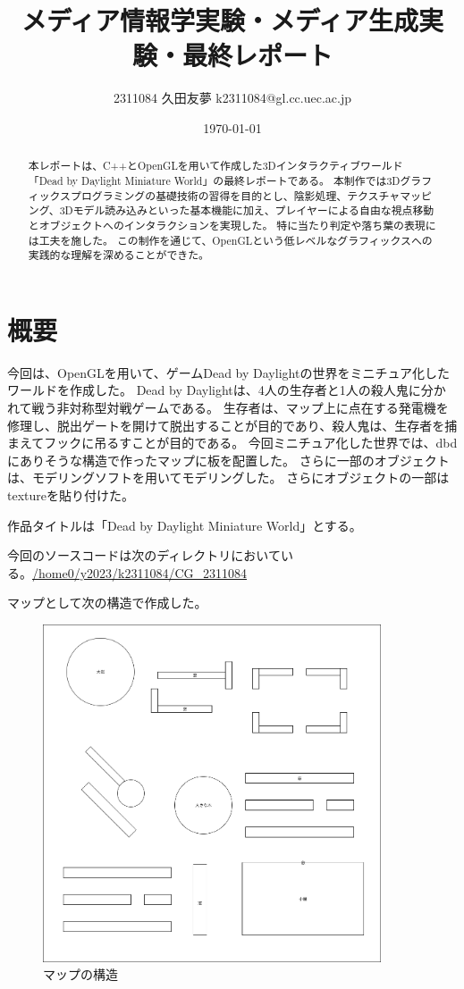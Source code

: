 \documentclass[uplatex,dvipdfmx,a4paper]{jsarticle}
\title{メディア情報学実験・メディア生成実験・最終レポート}
\author{2311084 久田友夢 k2311084@gl.cc.uec.ac.jp}
\date{\today}
\begin{document}
\maketitle

\begin{abstract}
本レポートは、C++とOpenGLを用いて作成した3Dインタラクティブワールド「Dead by Daylight Miniature World」の最終レポートである。
本制作では3Dグラフィックスプログラミングの基礎技術の習得を目的とし、陰影処理、テクスチャマッピング、3Dモデル読み込みといった基本機能に加え、プレイヤーによる自由な視点移動とオブジェクトへのインタラクションを実現した。
特に当たり判定や落ち葉の表現には工夫を施した。
この制作を通じて、OpenGLという低レベルなグラフィックスへの実践的な理解を深めることができた。
\end{abstract}

\tableofcontents
\clearpage

\section{概要}
今回は、OpenGLを用いて、ゲームDead by Daylightの世界をミニチュア化したワールドを作成した。
Dead by Daylightは、4人の生存者と1人の殺人鬼に分かれて戦う非対称型対戦ゲームである。
生存者は、マップ上に点在する発電機を修理し、脱出ゲートを開けて脱出することが目的であり、殺人鬼は、生存者を捕まえてフックに吊るすことが目的である。
今回ミニチュア化した世界では、dbdにありそうな構造で作ったマップに板を配置した。
さらに一部のオブジェクトは、モデリングソフトを用いてモデリングした。
さらにオブジェクトの一部はtextureを貼り付けた。

作品タイトルは「Dead by Daylight Miniature World」とする。

今回のソースコードは次のディレクトリにおいている。\url{/home0/y2023/k2311084/CG_2311084}

マップとして次の構造で作成した。
\begin{figure}[H]
    \centering
    \includegraphics[width=10cm]{MediaEX_試案.png}
    \caption{マップの構造}
    \label{fig:my_label}
\end{figure}
\end{document}
